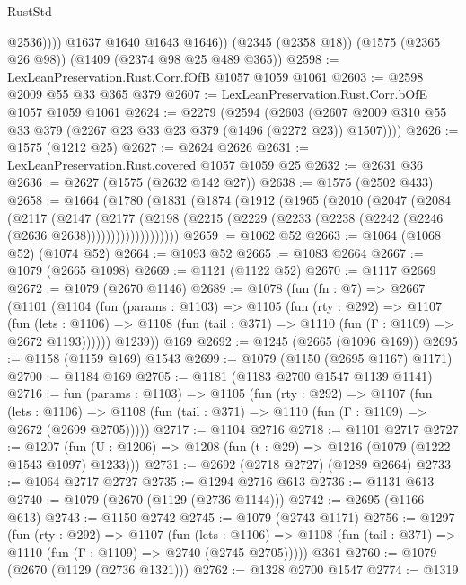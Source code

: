 \begin{lexlean}{RustStd}
\begin{coremodule}
{\begin{coremodule}
{{{{{{{{{{                @2536))))
        @1637
        @1640
        @1643
        @1646))
    (@2345 (@2358 @18))
    (@1575 (@2365 @26 @98))
    (@1409 (@2374 @98 @25 @489 @365))
@2598 := LexLeanPreservation.Rust.Corr.fOfB @1057 @1059 @1061
@2603 := @2598 @2009 @55 @33 @365 @379
@2607 := LexLeanPreservation.Rust.Corr.bOfE @1057 @1059 @1061
@2624 := @2279
    (@2594
      (@2603 (@2607 @2009 @310 @55 @33 @379 (@2267 @23 @33 @23 @379 (@1496 (@2272 @23)) @1507))))
@2626 := @1575 (@1212 @25)
@2627 := @2624 @2626
@2631 := LexLeanPreservation.Rust.covered @1057 @1059 @25
@2632 := @2631 @36
@2636 := @2627 (@1575 (@2632 @142 @27))
@2638 := @1575 (@2502 @433)
@2658 := @1664
    (@1780
      (@1831
        (@1874
          (@1912
            (@1965
              (@2010
                (@2047
                  (@2084
                    (@2117
                      (@2147
                        (@2177
                          (@2198
                            (@2215
                              (@2229 (@2233 (@2238 (@2242 (@2246 (@2636 @2638)))))))))))))))))))
@2659 := @1062 @52
@2663 := @1064 (@1068 @52) (@1074 @52)
@2664 := @1093 @52
@2665 := @1083 @2664
@2667 := @1079 (@2665 @1098)
@2669 := @1121 (@1122 @52)
@2670 := @1117 @2669
@2672 := @1079 (@2670 @1146)
@2689 := @1078
    (fun (fn : @7) =>
    @2667
      (@1101
        (@1104
          (fun (params : @1103) =>
          @1105
            (fun (rty : @292) =>
            @1107
              (fun (lets : @1106) =>
              @1108 (fun (tail : @371) => @1110 (fun (Γ : @1109) => @2672 @1193))))))
        @1239))
    @169
@2692 := @1245 (@2665 (@1096 @169))
@2695 := @1158 (@1159 @169) @1543
@2699 := @1079 (@1150 (@2695 @1167) @1171)
@2700 := @1184 @169
@2705 := @1181 (@1183 @2700 @1547 @1139 @1141)
@2716 := fun (params : @1103) =>
  @1105
    (fun (rty : @292) =>
    @1107
      (fun (lets : @1106) =>
      @1108 (fun (tail : @371) => @1110 (fun (Γ : @1109) => @2672 (@2699 @2705)))))
@2717 := @1104 @2716
@2718 := @1101 @2717
@2727 := @1207 (fun (U : @1206) => @1208 (fun (t : @29) => @1216 (@1079 (@1222 @1543 @1097) @1233)))
@2731 := @2692 (@2718 @2727) (@1289 @2664)
@2733 := @1064 @2717 @2727
@2735 := @1294 @2716 @613
@2736 := @1131 @613
@2740 := @1079 (@2670 (@1129 (@2736 @1144)))
@2742 := @2695 (@1166 @613)
@2743 := @1150 @2742
@2745 := @1079 (@2743 @1171)
@2756 := @1297
    (fun (rty : @292) =>
    @1107
      (fun (lets : @1106) =>
      @1108 (fun (tail : @371) => @1110 (fun (Γ : @1109) => @2740 (@2745 @2705)))))
    @361
@2760 := @1079 (@2670 (@1129 (@2736 @1321)))
@2762 := @1328 @2700 @1547
@2774 := @1319
}}}}}}}}}}
\end{coremodule}}
\end{coremodule}
\end{lexlean}
